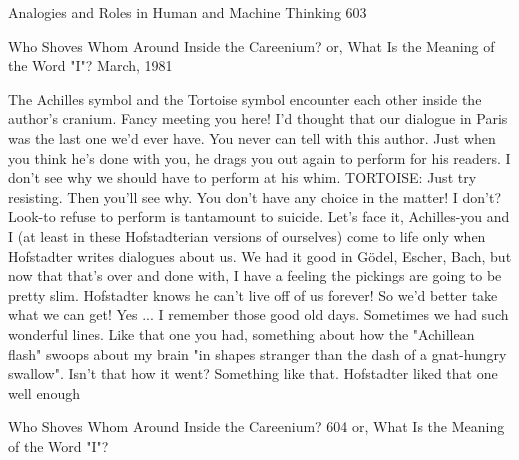 Analogies and Roles in Human and Machine Thinking                                 603


                    Who Shoves Whom Around
                      Inside the Careenium?
                     or, What Is the Meaning
                         of the Word "I"?
                                    March, 1981



         The Achilles symbol and the Tortoise symbol encounter each other
                           inside the author's cranium.
\achilles Fancy meeting you here! I'd thought that our dialogue in Paris was the
  last one we'd ever have.
\tortoise You never can tell with this author. Just when you think he's done with
  you, he drags you out again to perform for his readers.
\achilles I don't see why we should have to perform at his whim. TORTOISE:
  Just try resisting. Then you'll see why. You don't have any choice in the matter!
\achilles I don't?
\tortoise Look-to refuse to perform is tantamount to suicide. Let's face it,
  Achilles-you and I (at least in these Hofstadterian versions of ourselves) come to
  life only when Hofstadter writes dialogues about us. We had it good in Gödel,
  Escher, Bach, but now that that's over and done with, I have a feeling the pickings
  are going to be pretty slim. Hofstadter knows he can't live off of us forever! So
  we'd better take what we can get!
\achilles Yes ... I remember those good old days. Sometimes we had such
  wonderful lines. Like that one you had, something about how the "Achillean flash"
  swoops about my brain "in shapes stranger than the dash of a gnat-hungry
  swallow". Isn't that how it went?
\tortoise Something like that. Hofstadter liked that one well enough




Who Shoves Whom Around Inside the Careenium?                                     604
or, What Is the Meaning of the Word "I"?

